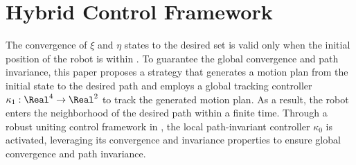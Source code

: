 \section{Hybrid Control Framework} \label{sec:control}
The convergence of $\xi$ and $\eta$ states to the desired set is valid only when the initial position of the robot is within . To guarantee the global convergence and path invariance, this paper proposes a strategy that generates a motion plan from the initial state to the desired path and employs a global tracking controller $\kappa_1:\Real^4 \to \Real^2$ to track the generated motion plan. As a result, the robot enters the neighborhood of the desired path within a finite time. Through a robust uniting control framework in \cite{San2021}, the local path-invariant controller $\kappa_0$ is activated, leveraging its convergence and invariance properties to ensure global convergence and path invariance.



